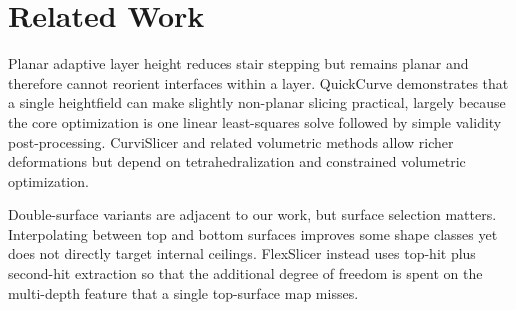 \section{Related Work}

Planar adaptive layer height reduces stair stepping but remains planar and therefore cannot reorient interfaces within a layer. QuickCurve demonstrates that a single heightfield can make slightly non-planar slicing practical, largely because the core optimization is one linear least-squares solve followed by simple validity post-processing. CurviSlicer and related volumetric methods allow richer deformations but depend on tetrahedralization and constrained volumetric optimization.

Double-surface variants are adjacent to our work, but surface selection matters. Interpolating between top and bottom surfaces improves some shape classes yet does not directly target internal ceilings. FlexSlicer instead uses top-hit plus second-hit extraction so that the additional degree of freedom is spent on the multi-depth feature that a single top-surface map misses.
